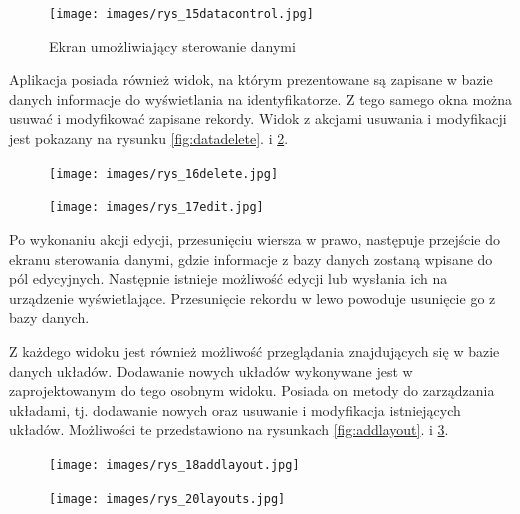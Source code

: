 \documentclass[a4paper,12pt, twoside]{article}
\begin{document}
    	\begin{figure}[H]
    	        \centering
    			\texttt{[image: images/rys\_15datacontrol.jpg]}
    			\caption{Ekran umożliwiający sterowanie danymi}
                \label{fig:datacontrol}
    	\end{figure}
    	
    	Aplikacja posiada również widok, na którym prezentowane są zapisane w bazie danych informacje do wyświetlania na identyfikatorze. Z tego samego okna można usuwać i modyfikować zapisane rekordy. Widok z akcjami usuwania i modyfikacji jest pokazany na rysunku \ref{fig:datadelete}. i \ref{fig:dataedit}.
    	
    	\begin{figure}[H]
    	\centering
    	\begin{minipage}{.5\textwidth}
    	    \centering
    	    \texttt{[image: images/rys\_16delete.jpg]}
            \label{fig:datadelete}
        \end{minipage}%
        \begin{minipage}{.5\textwidth}
            \centering
    	    \texttt{[image: images/rys\_17edit.jpg]}
            \label{fig:dataedit}
        \end{minipage}
    	\end{figure}
    	
    	Po wykonaniu akcji edycji, przesunięciu wiersza w prawo, następuje przejście do ekranu sterowania danymi, gdzie informacje z bazy danych zostaną wpisane do pól edycyjnych. Następnie istnieje możliwość edycji lub wysłania ich na urządzenie wyświetlające. Przesunięcie rekordu w lewo powoduje usunięcie go z bazy danych.
    	
    	Z każdego widoku jest również możliwość przeglądania znajdujących się w bazie danych układów. Dodawanie nowych układów wykonywane jest w zaprojektowanym do tego osobnym widoku. Posiada on metody do zarządzania układami, tj. dodawanie nowych oraz usuwanie i modyfikacja istniejących układów. Możliwości te przedstawiono na rysunkach \ref{fig:addlayout}. i \ref{fig:showlayout}. 
    	
    	\begin{figure}[H]
    	\centering
    	\begin{minipage}{.5\textwidth}
    	    \centering
    	    \texttt{[image: images/rys\_18addlayout.jpg]}
            \label{fig:addlayout}
        \end{minipage}%
        \begin{minipage}{.5\textwidth}
            \centering
    	    \texttt{[image: images/rys\_20layouts.jpg]}
            \label{fig:showlayout}
        \end{minipage}
    	\end{figure}
    	
\end{document}
